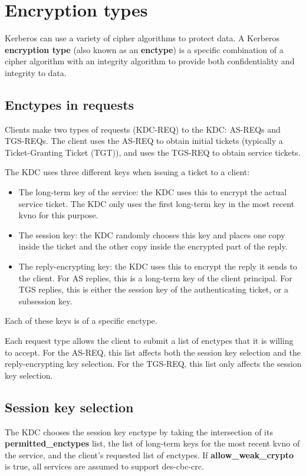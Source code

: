 \documentclass[letterpaper,10pt,english]{sphinxmanual}
\begin{document}
\chapter{Encryption types}
\label{admin/enctypes:enctypes}\label{admin/enctypes::doc}\label{admin/enctypes:encryption-types}
Kerberos can use a variety of cipher algorithms to protect data.  A
Kerberos \textbf{encryption type} (also known as an \textbf{enctype}) is a
specific combination of a cipher algorithm with an integrity algorithm
to provide both confidentiality and integrity to data.


\section{Enctypes in requests}
\label{admin/enctypes:enctypes-in-requests}
Clients make two types of requests (KDC-REQ) to the KDC: AS-REQs and
TGS-REQs.  The client uses the AS-REQ to obtain initial tickets
(typically a Ticket-Granting Ticket (TGT)), and uses the TGS-REQ to
obtain service tickets.

The KDC uses three different keys when issuing a ticket to a client:
\begin{itemize}
\item {} 
The long-term key of the service: the KDC uses this to encrypt the
actual service ticket.  The KDC only uses the first long-term key in
the most recent kvno for this purpose.

\item {} 
The session key: the KDC randomly chooses this key and places one
copy inside the ticket and the other copy inside the encrypted part
of the reply.

\item {} 
The reply-encrypting key: the KDC uses this to encrypt the reply it
sends to the client.  For AS replies, this is a long-term key of the
client principal.  For TGS replies, this is either the session key of the
authenticating ticket, or a subsession key.

\end{itemize}

Each of these keys is of a specific enctype.

Each request type allows the client to submit a list of enctypes that
it is willing to accept.  For the AS-REQ, this list affects both the
session key selection and the reply-encrypting key selection.  For the
TGS-REQ, this list only affects the session key selection.


\section{Session key selection}
\label{admin/enctypes:session-key-selection}\label{admin/enctypes:id1}
The KDC chooses the session key enctype by taking the intersection of
its \textbf{permitted\_enctypes} list, the list of long-term keys for the
most recent kvno of the service, and the client's requested list of
enctypes.  If \textbf{allow\_weak\_crypto} is true, all services are assumed
to support des-cbc-crc.
\end{document}
